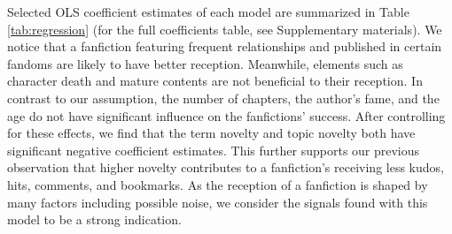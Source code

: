 \documentclass[letterpaper]{article} %
\begin{document}
Selected OLS coefficient estimates of each model are summarized in Table \ref{tab:regression} (for the full coefficients table, see Supplementary materials). We notice that a fanfiction featuring frequent relationships and published in certain fandoms are likely to have better reception. Meanwhile, elements such as character death and mature contents are not beneficial to their reception. In contrast to our assumption, the number of chapters, the author's fame, and the age do not have significant influence on the fanfictions' success. After controlling for these effects, we find that the term novelty and topic novelty both have significant negative coefficient estimates. This further supports our previous observation that higher novelty contributes to a fanfiction's receiving less kudos, hits, comments, and bookmarks. As the reception of a fanfiction is shaped by many factors including possible noise, we consider the signals found with this model to be a strong indication.
\end{document}
